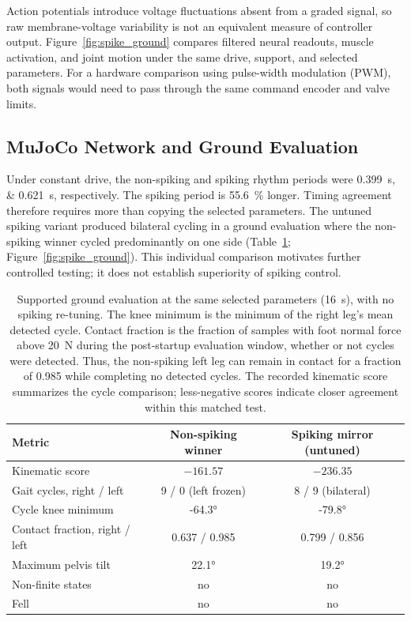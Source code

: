 Action potentials introduce voltage fluctuations absent from a graded signal, so raw membrane-voltage variability is not an equivalent measure of controller output. Figure~\ref{fig:spike_ground} compares filtered neural readouts, muscle activation, and joint motion under the same drive, support, and selected parameters. For a hardware comparison using pulse-width modulation (PWM), both signals would need to pass through the same command encoder and valve limits.

\subsection{MuJoCo Network and Ground Evaluation}

Under constant drive, the non-spiking and spiking rhythm periods were \qtylist{0.399;0.621}{\second}, respectively. The spiking period is \qty{55.6}{\percent} longer. Timing agreement therefore requires more than copying the selected parameters. The untuned spiking variant produced bilateral cycling in a ground evaluation where the non-spiking winner cycled predominantly on one side (Table~\ref{tab:spike_ground}; Figure~\ref{fig:spike_ground}). This individual comparison motivates further controlled testing; it does not establish superiority of spiking control.

\begin{table}[htbp]
\caption{Supported ground evaluation at the same selected parameters (\qty{16}{\second}), with no spiking re-tuning. The knee minimum is the minimum of the right leg's mean detected cycle. Contact fraction is the fraction of samples with foot normal force above \qty{20}{\newton} during the post-startup evaluation window, whether or not cycles were detected. Thus, the non-spiking left leg can remain in contact for a fraction of 0.985 while completing no detected cycles. The recorded kinematic score summarizes the cycle comparison; less-negative scores indicate closer agreement within this matched test.}
\label{tab:spike_ground}
\begin{tabular}{@{}lcc@{}}
\toprule
\textbf{Metric} & \textbf{Non-spiking winner} & \textbf{Spiking mirror (untuned)} \\
\midrule
Kinematic score                & $-161.57$          & $-236.35$ \\
Gait cycles, right / left      & 9 / 0 (left frozen) & 8 / 9 (bilateral) \\
Cycle knee minimum             & \ang{-64.3}         & \ang{-79.8} \\
Contact fraction, right / left     & 0.637 / 0.985       & 0.799 / 0.856 \\
Maximum pelvis tilt            & \ang{22.1}          & \ang{19.2} \\
Non-finite states              & no                  & no \\
Fell                            & no                  & no \\
\bottomrule
\end{tabular}
\end{table}

